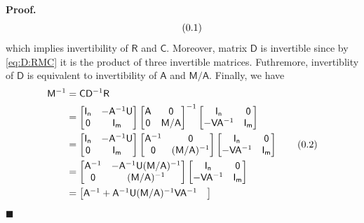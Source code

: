\documentclass[10pt]{article}
\theoremstyle{definition}
\newenvironment{prf}{\noindent\textbf{Proof.}}{\hfill$\blacksquare$}
\newcommand\eqnum{\addtocounter{equation}{1}\tag{\arabic{section}.\arabic{equation}}}
\begin{document}
\begin{prf}
\begin{equation}
\eqnum
\label{eq:det:RC}
\end{equation}
which implies invertibility of $\mathsf{R}$ and $\mathsf{C}$. Moreover, matrix $\mathsf{D}$ is invertible since by \cref{eq:D:RMC} it is the product of three invertible matrices. Futhremore, invertiblity of $\mathsf{D}$ is equivalent to invertibility of $\mathsf{A}$ and $\mathsf{M}/\mathsf{A}$. Finally, we have
\begin{align*}
\mathsf{M}^{-1} &= \mathsf{C}\mathsf{D}^{-1}\mathsf{R} \\
&= 
\begin{bmatrix}
\mathsf{I_n} & -\mathsf{A}^{-1}\mathsf{U} \\
\mathsf{0} & \mathsf{I_m}
\end{bmatrix}
\begin{bmatrix}
\mathsf{A} & \mathsf{0} \\
\mathsf{0} & \mathsf{M}/\mathsf{A}
\end{bmatrix}^{-1}
\begin{bmatrix}
\mathsf{I_n} & \mathsf{0} \\
-\mathsf{V}\mathsf{A}^{-1} & \mathsf{I_m}
\end{bmatrix} \\ &=
\begin{bmatrix}
\mathsf{I_n} & -\mathsf{A}^{-1}\mathsf{U} \\
\mathsf{0} & \mathsf{I_m}
\end{bmatrix}
\begin{bmatrix}
\mathsf{A}^{-1} & \mathsf{0} \\
\mathsf{0} & (\mathsf{M}/\mathsf{A})^{-1}
\end{bmatrix}
\begin{bmatrix}
\mathsf{I_n} & \mathsf{0} \\
-\mathsf{V}\mathsf{A}^{-1} & \mathsf{I_m}
\end{bmatrix} 
\eqnum 
\label{eq:MIL:decomposition}
\\ &=
\begin{bmatrix}
\mathsf{A}^{-1} & -\mathsf{A}^{-1}\mathsf{U}(\mathsf{M}/\mathsf{A})^{-1} \\
\mathsf{0} & (\mathsf{M}/\mathsf{A})^{-1}
\end{bmatrix}
\begin{bmatrix}
\mathsf{I_n} & \mathsf{0} \\
-\mathsf{V}\mathsf{A}^{-1} & \mathsf{I_m}
\end{bmatrix} \\ &=
\begin{bmatrix}
\mathsf{A}^{-1} + \mathsf{A}^{-1}\mathsf{U}(\mathsf{M}/\mathsf{A})^{-1}\mathsf{V}\mathsf{A}^{-1} & 

\end{bmatrix}
\end{align*}
\end{prf}
\end{document}

